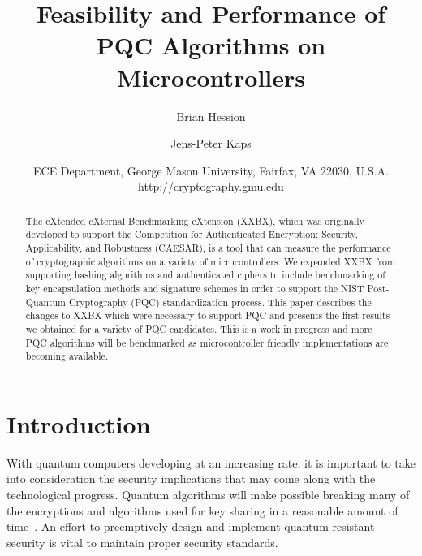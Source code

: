 \documentclass[10pt]{article}
\begin{document}
\title{Feasibility and Performance of PQC Algorithms on Microcontrollers %
} 

\author{Brian Hession \and Jens-Peter Kaps}

\date{ECE Department, George Mason University, Fairfax, VA 22030, U.S.A.\\
\url{http://cryptography.gmu.edu}}%

\maketitle

\begin{abstract}
The eXtended eXternal Benchmarking eXtension (XXBX), which was originally developed
to support the Competition for Authenticated Encryption: Security, Applicability, 
and Robustness (CAESAR), is a tool that can measure the performance of cryptographic 
algorithms on a variety of microcontrollers. We expanded XXBX from supporting 
hashing algorithms and authenticated ciphers to include benchmarking of key encapsulation 
methods and signature schemes in order to support the NIST Post-Quantum
Cryptography (PQC) standardization process. 
This paper describes the changes to XXBX which were necessary to support PQC and 
presents the first results we obtained for a variety of PQC candidates.
This is a work in progress and more PQC algorithms will be benchmarked as 
microcontroller friendly implementations are becoming available.
\end{abstract}


\section{Introduction}

With quantum computers developing at an increasing rate, it is important to take into 
consideration the security implications that may come along with the technological progress. 
Quantum algorithms will make possible breaking many of the encryptions and algorithms used for 
key sharing in a reasonable amount of time~\cite{nsareco}.
An effort to preemptively design and implement 
quantum resistant security is vital to maintain proper security standards.
\end{document}
